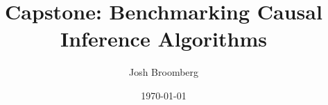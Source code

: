 \documentclass[../main.tex]{subfiles}
\begin{document}
\title{Capstone: Benchmarking Causal Inference Algorithms}
\author{Josh Broomberg}
\date{\today}
\maketitle
\end{document}
